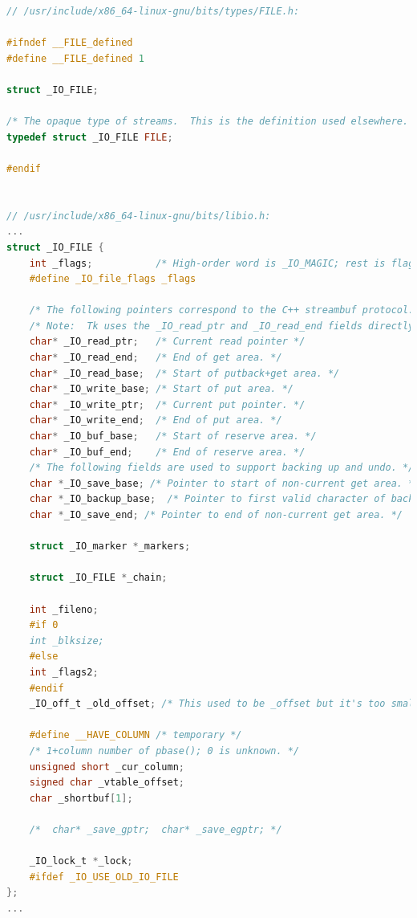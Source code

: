 \documentclass[12pt]{report}
\begin{document}
\begin{lstlisting}[language=c, label=_io_file, caption=Листинг структуры \_IO\_FILE]
// /usr/include/x86_64-linux-gnu/bits/types/FILE.h:

#ifndef __FILE_defined
#define __FILE_defined 1

struct _IO_FILE;

/* The opaque type of streams.  This is the definition used elsewhere.  */
typedef struct _IO_FILE FILE;

#endif


// /usr/include/x86_64-linux-gnu/bits/libio.h:
...
struct _IO_FILE {
	int _flags;           /* High-order word is _IO_MAGIC; rest is flags. */
	#define _IO_file_flags _flags
	
	/* The following pointers correspond to the C++ streambuf protocol. */
	/* Note:  Tk uses the _IO_read_ptr and _IO_read_end fields directly. */
	char* _IO_read_ptr;   /* Current read pointer */
	char* _IO_read_end;   /* End of get area. */
	char* _IO_read_base;  /* Start of putback+get area. */
	char* _IO_write_base; /* Start of put area. */
	char* _IO_write_ptr;  /* Current put pointer. */
	char* _IO_write_end;  /* End of put area. */
	char* _IO_buf_base;   /* Start of reserve area. */
	char* _IO_buf_end;    /* End of reserve area. */
	/* The following fields are used to support backing up and undo. */
	char *_IO_save_base; /* Pointer to start of non-current get area. */
	char *_IO_backup_base;  /* Pointer to first valid character of backup area */
	char *_IO_save_end; /* Pointer to end of non-current get area. */
	
	struct _IO_marker *_markers;
	
	struct _IO_FILE *_chain;
	
	int _fileno;
	#if 0
	int _blksize;
	#else
	int _flags2;
	#endif
	_IO_off_t _old_offset; /* This used to be _offset but it's too small.  */
	
	#define __HAVE_COLUMN /* temporary */
	/* 1+column number of pbase(); 0 is unknown. */
	unsigned short _cur_column;
	signed char _vtable_offset;
	char _shortbuf[1];
	
	/*  char* _save_gptr;  char* _save_egptr; */
	
	_IO_lock_t *_lock;
	#ifdef _IO_USE_OLD_IO_FILE
};
...
\end{lstlisting}
\end{document}

